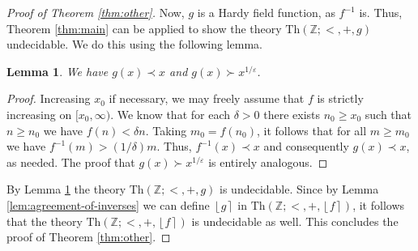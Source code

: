 \documentclass{amsart}
\newtheorem{lemma}[theorem]{Lemma}
\theoremstyle{definition}
\newcommand{\nint}[1]{\left\lfloor #1 \right\rceil}
\newcommand{\e}{\varepsilon}
\newcommand{\ZZ}{\mathbb{Z}}
\newcommand{\theory}[1]{\mathrm{Th}(#1)}
\newcommand{\inv}[1]{#1^{-1}}
\begin{document}
\begin{proof}[Proof of Theorem \ref{thm:other}]
Now, $g$ is a Hardy field function, as $\inv{f}$ is.  Thus, Theorem \ref{thm:main} can be applied to show the theory $\theory{\ZZ; <, +, g}$ undecidable. We do this using the following lemma.

\begin{lemma}
\label{lem:fast-growing-inverse}
We have $g(x) \prec x$ and $g(x) \succ x^{1/\e}$.
\end{lemma}
\begin{proof}
Increasing $x_0$ if necessary, we may freely assume that $f$ is strictly increasing on $[x_0,\infty)$. 
We know that for each $\delta > 0$ there exists $n_0 \geq x_0$ such that $n \geq n_0$ we have $f(n) < \delta n$. Taking $m_0 = f(n_0)$, it follows that for all $m \geq m_0$ we have $\inv{f}(m) > (1/\delta) m$. Thus, $\inv{f}(x) \prec x$ and consequently $g(x) \prec x$, as needed. The proof that $g(x) \succ x^{1/\e}$ is entirely analogous.
\end{proof}

By Lemma \ref{lem:fast-growing-inverse} the theory $\theory{\ZZ; <, +, g}$ is undecidable. Since by Lemma \ref{lem:agreement-of-inverses} we can define $\nint{g}$ in $\theory{\ZZ; <, +, \nint{f}}$, it follows that the theory $\theory{\ZZ; <, +, \nint{f}}$ is undecidable as well. This concludes the proof of Theorem \ref{thm:other}.
\end{proof} 



\end{document}
